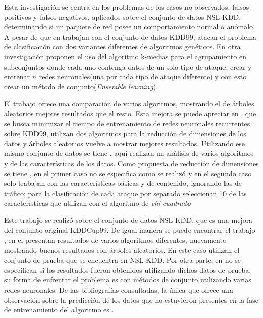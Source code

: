Esta investigación se centra en los problemas de los casos no observados, falsos positivos y falsos negativos, aplicados sobre el conjunto de datos NSL-KDD, determinando si un paquete de red posee un comportamiento normal o anómalo. A pesar de que en \cite{goyal2008ga,ahmadi2009intrusion} trabajan con el conjunto de datos KDD99, atacan el problema de clasificación con dos variantes diferentes de algoritmos genéticos. En otra investigación \cite{samrin2018hybrid} proponen el uso del algoritmo k-medias para el agrupamiento en subconjuntos donde cada uno contenga datos de un solo tipo de ataque, crear y entrenar $n$ redes neuronales(una por cada tipo de ataque diferente) y con esto crear un método de conjunto(\textit{Ensemble learning}). 

El trabajo \cite{almseidin2017evaluation} ofrece una comparación de varios algoritmos, mostrando el de árboles aleatorios mejores resultados que el resto. Esta mejora se puede apreciar en \cite{anani2018recurrent}, que se busca minimizar el tiempo de entrenamiento de redes neuronales recurrentes sobre KDD99, utilizan dos algoritmos para la reducción de dimensiones de los datos y árboles aleatorios vuelve a mostrar mejores resultados. Utilizando ese mismo conjunto de datos se tiene \cite{kabanda2019bayesian}, aquí realizan un análisis de varios algoritmos y de las características de los datos. Como propuesta de reducción de dimensiones se tiene \cite{sammany2007artificial,divyasree2018network}, en el primer caso no se especifica como se realizó y en el segundo caso solo trabajan con las características básicas y de contenido, ignorando las de tráfico; para la clasificación de cada ataque por separado seleccionan 10 de las características que utilizan con el algoritmo de \textit{chi cuadrado}

Este trabajo se realizó sobre el conjunto de datos NSL-KDD, que es una mejora del conjunto original KDDCup99. De igual manera se puede encontrar el trabajo \cite{abualkibash2019machine}, en el presentan resultados de varios algoritmos diferentes, nuevamente mostrando buenos resultados con árboles aleatorios. En este caso utilizan el conjunto de prueba que se encuentra en NSL-KDD. Por otra parte, en \cite{ludwig2019applying} no se especifican si los resultados fueron obtenidos utilizando dichos datos de prueba, su forma de enfrentar el problema es con métodos de conjunto utilizando varias redes neuronales. De las bibliografías consultadas, la única que ofrece una observación sobre la predicción de los datos que no estuvieron presentes en la fase de entrenamiento del algoritmo es \cite{abualkibash2019machine}.

